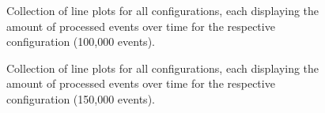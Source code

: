 \begin{figure}[h]
        \caption{Collection of line plots for all configurations, each displaying the amount of processed events over time for the respective configuration (100,000 events).}
        \label{fig:evaluation:performance:config-comparison_100k}
\end{figure}

\begin{figure}[h]
        \caption{Collection of line plots for all configurations, each displaying the amount of processed events over time for the respective configuration (150,000 events).}
        \label{fig:evaluation:performance:config-comparison_150k}
\end{figure}

